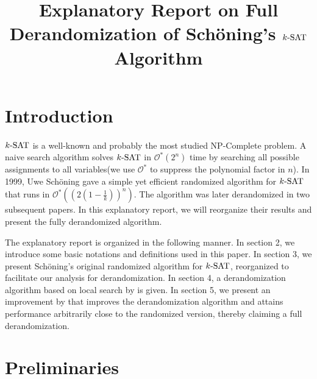 \documentclass[a4paper,12pts]{article}
\title{Explanatory Report on Full Derandomization of Sch\"{o}ning's $\SAT$ Algorithm}
\author{}
\date{}
\newcommand{\SAT}{\textnormal{$k$-SAT}}
\renewcommand{\O}{\mathcal{O}^*}
\begin{document}
\maketitle

\section{Introduction}
\paragraph{} $\SAT$ is a well-known and probably the most studied NP-Complete problem. A naive search algorithm solves $\SAT$ in $\O(2^n)$ time by searching all possible assignments to all variables(we use $\O$ to suppress the polynomial factor in $n$). In 1999, Uwe Sch\"{o}ning gave a simple yet efficient randomized algorithm for $\SAT$\cite{Schoning99} that runs in $\O((2(1-\frac{1}{k}))^n)$. The algorithm was later derandomized in two subsequent papers\cite{Dantsin02,Moser11}. In this explanatory report, we will reorganize their results and present the fully derandomized algorithm.\par 
The explanatory report is organized in the following manner. In section 2, we introduce some basic notations and definitions used in this paper. In section 3, we present Sch\"{o}ning's original randomized algorithm\cite{Schoning99} for $\SAT$, reorganized to facilitate our analysis for derandomization. In section 4, a derandomization algorithm based on local search by \cite{Dantsin02} is given. In section 5, we present an improvement by \cite{Moser11} that improves the derandomization algorithm and attains performance arbitrarily close to the randomized version, thereby claiming a full derandomization.

\section{Preliminaries}
\end{document}
